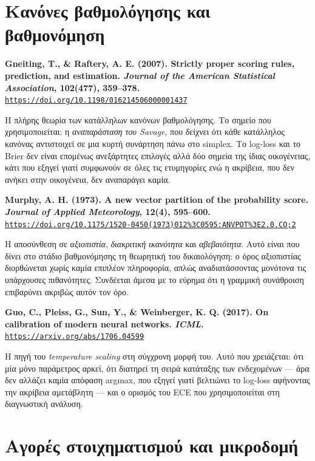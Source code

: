 \documentclass[11pt,a4paper]{article}
\newcommand{\en}[1]{\textenglish{#1}}
\newcommand{\src}[3]{%
  \par\medskip\noindent\textbf{#2}\\
  \href{#3}{\texttt{\small #3}}\par\smallskip}
\begin{document}
\section{Κανόνες βαθμολόγησης και βαθμονόμηση}

\src{gneiting2007}{Gneiting, T., \& Raftery, A. E. (2007). Strictly proper scoring rules,
prediction, and estimation. \emph{Journal of the American Statistical Association}, 102(477),
359--378.}
{https://doi.org/10.1198/016214506000001437}
Η πλήρης θεωρία των κατάλληλων κανόνων βαθμολόγησης. Το σημείο που χρησιμοποιείται: η
\emph{αναπαράσταση του Savage}, που δείχνει ότι κάθε κατάλληλος κανόνας αντιστοιχεί σε μια
κυρτή συνάρτηση πάνω στο simplex. Το log-loss και το Brier δεν είναι επομένως ανεξάρτητες
επιλογές αλλά δύο σημεία της ίδιας οικογένειας, κάτι που εξηγεί γιατί συμφωνούν σε όλες τις
ετυμηγορίες ενώ η ακρίβεια, που δεν ανήκει στην οικογένεια, δεν αναπαράγει καμία.

\src{murphy1973}{Murphy, A. H. (1973). A new vector partition of the probability score.
\emph{Journal of Applied Meteorology}, 12(4), 595--600.}
{https://doi.org/10.1175/1520-0450(1973)012\%3C0595:ANVPOT\%3E2.0.CO;2}
Η αποσύνθεση σε \emph{αξιοπιστία}, \emph{διακριτική ικανότητα} και \emph{αβεβαιότητα}. Αυτό
είναι που δίνει στο στάδιο βαθμονόμησης τη θεωρητική του δικαιολόγηση: ο όρος αξιοπιστίας
διορθώνεται χωρίς καμία επιπλέον πληροφορία, απλώς αναδιατάσσοντας μονότονα τις υπάρχουσες
πιθανότητες. Συνδέεται άμεσα με το εύρημα ότι η γραμμική συνάθροιση επιβαρύνει ακριβώς αυτόν
τον όρο.

\src{guo2017}{Guo, C., Pleiss, G., Sun, Y., \& Weinberger, K. Q. (2017). On calibration of
modern neural networks. \emph{ICML}.}
{https://arxiv.org/abs/1706.04599}
Η πηγή του \emph{temperature scaling} στη σύγχρονη μορφή του. Αυτό που χρειάζεται: ότι μία
μόνο παράμετρος αρκεί, ότι διατηρεί τη σειρά κατάταξης των ενδεχομένων --- άρα δεν αλλάζει
καμία απόφαση \en{argmax}, που εξηγεί γιατί βελτιώνει το log-loss αφήνοντας την ακρίβεια
αμετάβλητη --- και ο ορισμός του ECE που χρησιμοποιείται στη διαγνωστική ανάλυση.

\section{Αγορές στοιχηματισμού και μικροδομή}
\end{document}

